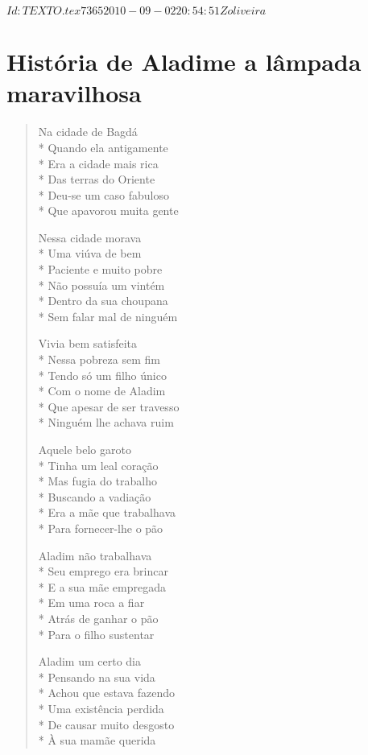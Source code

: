 \SVN $Id: TEXTO.tex 7365 2010-09-02 20:54:51Z oliveira $

\chapter[História de Aladim e a lâmpada maravilhosa]{História de Aladim\break e a lâmpada maravilhosa}

\begin{verse}
Na cidade de Bagdá\\*
Quando ela antigamente\\*
Era a cidade mais rica\\*
Das terras do Oriente\\*
Deu-se um caso fabuloso\\*
Que apavorou muita gente

Nessa cidade morava\\*
Uma viúva de bem\\*
Paciente e muito pobre\\*
Não possuía um vintém\\*
Dentro da sua choupana\\*
Sem falar mal de ninguém

Vivia bem satisfeita\\*
Nessa pobreza sem fim\\*
Tendo só um filho único\\*
Com o nome de Aladim\\*
Que apesar de ser travesso\\*
Ninguém lhe achava ruim

Aquele belo garoto\\*
Tinha um leal coração\\*
Mas fugia do trabalho\\*
Buscando a vadiação\\*
Era a mãe que trabalhava\\*
Para fornecer-lhe o pão

Aladim não trabalhava\\*
Seu emprego era brincar\\*
E a sua mãe empregada\\*
Em uma roca a fiar\\*
Atrás de ganhar o pão\\*
Para o filho sustentar

Aladim um certo dia\\*
Pensando na sua vida\\*
Achou que estava fazendo\\*
Uma existência perdida\\*
De causar muito desgosto\\*
À sua mamãe querida


\end{verse}
